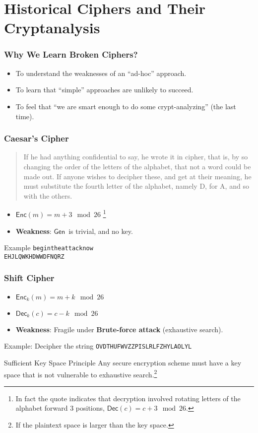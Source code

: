 \section{Historical Ciphers and Their Cryptanalysis}
\begin{frame}\frametitle{Why We Learn Broken Ciphers?}
\begin{itemize}
\item To understand the weaknesses of an ``ad-hoc'' approach.
\item To learn that ``simple'' approaches are unlikely to succeed.
\item To feel that ``we are smart enough to do some crypt-analyzing'' (the last time).
\end{itemize}
\end{frame}
\begin{frame}[fragile]\frametitle{Caesar's Cipher}
\begin{quote}
If he had anything confidential to say, he wrote it in cipher, that is, by so changing the order of the letters of the alphabet, that not a word could be made out. If anyone wishes to \alert{decipher} these, and get at their meaning, he must \alert{substitute the fourth letter of the alphabet, namely D, for A}, and so with the others.

\end{quote}
\begin{itemize}
	\item $\mathsf{Enc}(m)=m+3\mod 26$ \footnote{In fact the quote indicates that decryption involved rotating letters of the alphabet forward 3 positions, $\mathsf{Dec}(c)=c+3\mod 26$.}
	\item \textbf{Weakness}: $\mathsf{Gen}$~is trivial, and no key.
\end{itemize}
\begin{exampleblock}{Example}
\verb|begintheattacknow|\\
\verb|EHJLQWKHDWWDFNQRZ|
\end{exampleblock}
\end{frame}
\begin{frame}[fragile]\frametitle{Shift Cipher}
\begin{itemize}
\item $\mathsf{Enc}_k(m)=m+k\mod 26$
\item $\mathsf{Dec}_k(c)=c-k\mod 26$
\item \textbf{Weakness}: Fragile under \textbf{Brute-force attack} (exhaustive search). 
\end{itemize}
\begin{exampleblock}{Example: Decipher the string}	
\verb|OVDTHUFWVZZPISLRLFZHYLAOLYL|
\end{exampleblock}
\begin{alertblock}{Sufficient Key Space Principle}
Any secure encryption scheme must have a key space that is not vulnerable to exhaustive search.\footnote{If the plaintext space is larger than the key space.}
\end{alertblock}
\end{frame}

